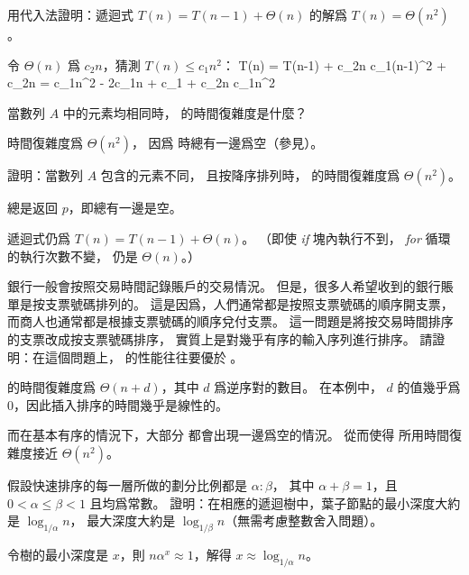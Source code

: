 \startsection[
  title=Performance of quicksort
]

\startEXERCISE
用代入法證明：遞迴式 $T(n)=T(n-1)+\Theta(n)$ 的解爲 $T(n)=\Theta(n^2)$。
\stopEXERCISE

\startANSWER
令 $\Theta(n)$ 爲 $c_2 n$，猜測 $T(n)\le c_1 n^2$：
\startsplitformula\startmathalignment
\NC T(n) \NC=   T(n-1) + c_2n \NR
\NC      \NC\le c_1(n-1)^2 + c_2n \NR
\NC      \NC=   c_1n^2 - 2c_1n + c_1 + c_2n \NR
\NC      \NC\le c_1n^2 \NR
\stopmathalignment\stopsplitformula
\stopANSWER

\startEXERCISE
當數列 $A$ 中的元素均相同時，  的時間復雜度是什麼？
\stopEXERCISE

\startANSWER
時間復雜度爲 $\Theta(n^2)$，
因爲  時總有一邊爲空（參見）。
\stopANSWER

\startEXERCISE
證明：當數列 $A$ 包含的元素不同，
且按降序排列時，  的時間復雜度爲 $\Theta(n^2)$。
\stopEXERCISE

\startANSWER
{} 總是返回 $p$，即總有一邊是空。

遞迴式仍爲 $T(n)=T(n-1)+\Theta(n)$。
（即使 \emph{if} 塊內執行不到， \emph{for} 循環的執行次數不變，
仍是 $\Theta(n)$。）
\stopANSWER

\startEXERCISE
銀行一般會按照交易時間記錄賬戶的交易情況。
但是，很多人希望收到的銀行賬單是按支票號碼排列的。
這是因爲，人們通常都是按照支票號碼的順序開支票，
而商人也通常都是根據支票號碼的順序兌付支票。
這一問題是將按交易時間排序的支票改成按支票號碼排序，
實質上是對幾乎有序的輸入序列進行排序。
請證明：在這個問題上，  的性能往往要優於 。
\stopEXERCISE

\startANSWER
{} 的時間復雜度爲 $\Theta(n+d)$，其中 $d$ 爲逆序對的數目。
在本例中， $d$ 的值幾乎爲 $0$，因此插入排序的時間幾乎是線性的。

而在基本有序的情況下，大部分  都會出現一邊爲空的情況。
從而使得  所用時間復雜度接近 $\Theta(n^2)$。
\stopANSWER

\startEXERCISE
假設快速排序的每一層所做的劃分比例都是 $\alpha : \beta$，
其中 $\alpha+\beta=1$，且 $0<\alpha\le \beta < 1$ 且均爲常數。
證明：在相應的遞迴樹中，葉子節點的最小深度大約是 $\log_{1/\alpha}{n}$，
最大深度大約是 $\log_{1/\beta}{n}$（無需考慮整數舍入問題）。
\stopEXERCISE

\startANSWER
令樹的最小深度是 $x$，則 $n\alpha^x\approx 1$，解得 $x\approx\log_{1/\alpha}{n}$。

